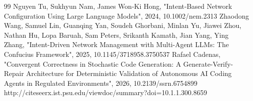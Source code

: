 \documentclass[conference]{IEEEtran}
\begin{document}
\begin{thebibliography}{99}
 Nguyen Tu, Sukhyun Nam, James Won‐Ki Hong, "Intent‐Based Network Configuration Using Large Language Models", 2024, 10.1002/nem.2313
 Zhaodong Wang, Samuel Lin, Guanqing Yan, Soudeh Ghorbani, Minlan Yu, Jiawei Zhou, Nathan Hu, Lopa Baruah, Sam Peters, Srikanth Kamath, Jian Yang, Ying Zhang, "Intent-Driven Network Management with Multi-Agent LLMs: The Confucius Framework", 2025, 10.1145/3718958.3750537
 Rafael Cadenas, "Convergent Correctness in Stochastic Code Generation: A Generate-Verify-Repair Architecture for Deterministic Validation of Autonomous AI Coding Agents in Regulated Environments", 2026, 10.2139/ssrn.6754899
 http://citeseerx.ist.psu.edu/viewdoc/summary?doi=10.1.1.300.8659
\end{thebibliography}
\end{document}

